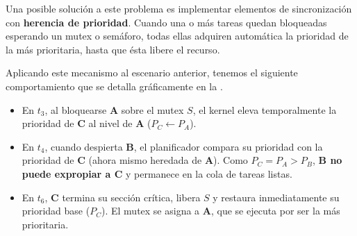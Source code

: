 \documentclass[../main.tex]{subfiles}
\begin{document}
            Una posible solución a este problema es implementar elementos de sincronización con \textbf{herencia de prioridad}. Cuando una o más tareas quedan bloqueadas esperando un mutex o semáforo, todas ellas adquiren automática la prioridad de la más prioritaria, hasta que ésta libere el recurso.

            Aplicando este mecanismo al escenario anterior, tenemos el siguiente comportamiento que se detalla gráficamente en la .
            \begin{itemize}
                \item En $t_3$, al bloquearse \textbf{A} sobre el mutex $S$, el kernel eleva temporalmente la prioridad de \textbf{C} al nivel de \textbf{A} ($P_C \leftarrow P_A$).
                \item En $t_4$, cuando despierta \textbf{B}, el planificador compara su prioridad con la prioridad de \textbf{C} (ahora mismo heredada de \textbf{A}). Como $P_C = P_A > P_B$, \textbf{B no puede expropiar a C} y permanece en la cola de tareas listas.
                \item En $t_6$, \textbf{C} termina su sección crítica, libera $S$ y restaura inmediatamente su prioridad base ($P_C$). El mutex se asigna a \textbf{A}, que se ejecuta por ser la más prioritaria.
            \end{itemize}
\end{document}
